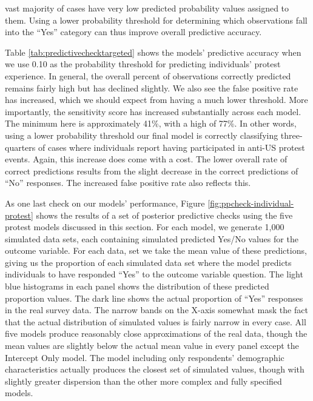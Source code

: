 vast majority of cases have very low predicted probability values assigned to them. Using a lower probability threshold for determining which observations fall into the ``Yes'' category can thus improve overall predictive accuracy.




Table \ref{tab:predictivechecktargeted} shows the models' predictive accuracy when we use 0.10 as the probability threshold for predicting individuals' protest experience. In general, the overall percent of observations correctly predicted remains fairly high but has declined slightly. We also see the false positive rate has increased, which we should expect from having a much lower threshold. More importantly, the sensitivity score has increased substantially across each model. The minimum here is approximately 41\%, with a high of 77\%. In other words, using a lower probability threshold our final model is correctly classifying three-quarters of cases where individuals report having participated in anti-US protest events. Again, this increase does come with a cost. The lower overall rate of correct predictions results from the slight decrease in the correct predictions of ``No'' responses. The increased false positive rate also reflects this. 

As one last check on our models' performance, Figure \ref{fig:ppcheck-individual-protest} shows the results of a set of posterior predictive checks using the five protest models discussed in this section. For each model, we generate 1,000 simulated data sets, each containing simulated predicted Yes/No values for the outcome variable. For each data, set we take the mean value of these predictions, giving us the proportion of each simulated data set where the model predicts individuals to have responded ``Yes'' to the outcome variable question. The light blue histograms in each panel shows the distribution of these predicted proportion values. The dark line shows the actual proportion of ``Yes'' responses in the real survey data. The narrow bands on the X-axis somewhat mask the fact that the actual distribution of simulated values is fairly narrow in every case. All five models produce reasonably close approximations of the real data, though the mean values are slightly below the actual mean value in every panel except the Intercept Only model. The model including only respondents' demographic characteristics actually produces the closest set of simulated values, though with slightly greater dispersion than the other more complex and fully specified models. 

